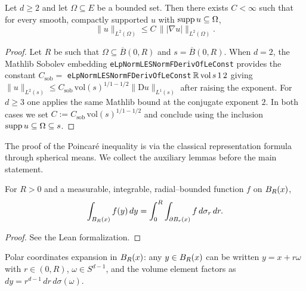 \begin{lemma}
\label{lem:smoothCompactSupport_L2_bound_on_bounded_ge_two}
\leanok
{}
Let $d \ge 2$ and let $\Omega \subseteq E$ be a bounded set. Then there exists
$C < \infty$ such that for every smooth, compactly supported $u$ with $\operatorname{supp} u
\subseteq \Omega$,
\begin{equation*}
\lVert u\rVert_{L^{2}(\Omega)}
\le C\, \lVert \lvert\nabla u\rvert\rVert_{L^{2}(\Omega)}.
\end{equation*}
\end{lemma}
\begin{proof}
\leanok

Let $R$ be such that $\Omega \subseteq \overline{B}(0,R)$ and $s = \overline{B}(0,R)$.
When $d = 2$, the Mathlib Sobolev embedding
\texttt{eLpNormLESNormFDerivOfLeConst} provides the constant
$C_{\mathrm{sob}} = $ \texttt{eLpNormLESNormFDerivOfLeConst}\,$\mathbb{R}\,\mathrm{vol}\,s\,1\,2$
giving
$\lVert u\rVert_{L^{2}(s)} \le C_{\mathrm{sob}}\,\mathrm{vol}(s)^{1/1 - 1/2}
\lVert \mathrm{D}u\rVert_{L^{1}(s)}^{}$ after raising the exponent. For $d \ge 3$ one
applies the same Mathlib bound at the conjugate exponent $2$. In both cases we set
$C := C_{\mathrm{sob}}\,\mathrm{vol}(s)^{1/1 - 1/2}$ and conclude using the inclusion
$\operatorname{supp} u \subseteq \Omega \subseteq s$.
\end{proof}

The proof of the Poincar\'e inequality is via the classical representation formula
through spherical means. We collect the auxiliary lemmas before the main statement.

\begin{lemma}
\label{lem:sphere_radial_integral_ball}
\leanok
For $R > 0$ and a measurable, integrable, radial--bounded function $f$ on $B_{R}(x)$,
\begin{equation*}
\int_{B_{R}(x)} f(y)\, dy
= \int_{0}^{R} \int_{\partial B_{r}(x)} f \, d\sigma_{r}\, dr.
\end{equation*}
\end{lemma}

\begin{proof}
\leanok
{}
See the Lean formalization.
\end{proof}

\begin{lemma}
\label{lem:polar_identity_ball}
\leanok
Polar coordinates expansion in $B_{R}(x)$: any $y \in B_{R}(x)$ can be written
$y = x + r\omega$ with $r \in (0,R)$, $\omega \in S^{d-1}$, and the volume element
factors as $dy = r^{d-1}\, dr\, d\sigma(\omega)$.
\end{lemma}

